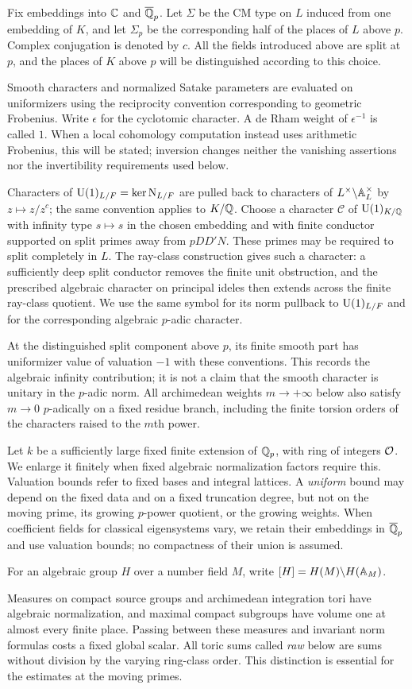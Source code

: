Fix embeddings into $\mathbb C$ and $\overline{\mathbb Q}_p$. Let $\Sigma$ be the CM
type on $L$ induced from one embedding of $K$, and let $\Sigma_p$ be
the corresponding half of the places of $L$ above $p$. Complex
conjugation is denoted by $c$. All the fields introduced above are
split at $p$, and the places of $K$ above $p$ will be distinguished
according to this choice.

Smooth characters and normalized Satake parameters are evaluated on
uniformizers using the reciprocity convention corresponding to
geometric Frobenius. Write $\epsilon$ for the cyclotomic character.
A de Rham weight of $\epsilon^{-1}$ is called $1$. When a local
cohomology computation instead uses arithmetic Frobenius, this will
be stated; inversion changes neither the vanishing assertions nor
the invertibility requirements used below.

Characters of $\operatorname{U}(1)_{L/F}=\ker\operatorname{N}_{L/F}$ are pulled back to
characters of $L^\times\backslash\mathbb A_L^\times$ by $z\mapsto z/z^c$;
the same convention applies to $K/\mathbb Q$. Choose a character
$\mathcal C$ of $\operatorname{U}(1)_{K/\mathbb Q}$ with infinity type $s\mapsto s$ in
the chosen embedding and with finite conductor supported on split
primes away from $pDD'N$. These primes may be required to split
completely in $L$. The ray-class construction gives such a character:
a sufficiently deep split conductor removes the finite unit
obstruction, and the prescribed algebraic character on principal
ideles then extends across the finite ray-class quotient. We use the
same symbol for its norm pullback to $\operatorname{U}(1)_{L/F}$ and for the
corresponding algebraic $p$-adic character.

At the distinguished split component above $p$, its finite smooth
part has uniformizer value of valuation $-1$ with these conventions.
This records the algebraic infinity contribution; it is not a claim
that the smooth character is unitary in the $p$-adic norm. All
archimedean weights $m\to+\infty$ below also satisfy $m\to0$
$p$-adically on a fixed residue branch, including the finite torsion
orders of the characters raised to the $m$th power.

Let $k$ be a sufficiently large fixed finite extension of $\mathbb Q_p$,
with ring of integers $\mathcal O$. We enlarge it finitely when fixed
algebraic normalization factors require this. Valuation bounds refer
to fixed bases and integral lattices. A \emph{uniform} bound may
depend on the fixed data and on a fixed truncation degree, but not on
the moving prime, its growing $p$-power quotient, or the growing
weights. When coefficient fields for classical eigensystems vary,
we retain their embeddings in $\overline{\mathbb Q}_p$ and use valuation
bounds; no compactness of their union is assumed.

For an algebraic group $H$ over a number field $M$, write
$[H]=H(M)\backslash H(\mathbb A_M)$.

Measures on compact source groups and archimedean integration tori
have algebraic normalization, and maximal compact subgroups have
volume one at almost every finite place. Passing between these
measures and invariant norm formulas costs a fixed global scalar.
All toric sums called \emph{raw} below are sums without division by
the varying ring-class order. This distinction is essential for
the estimates at the moving primes.
